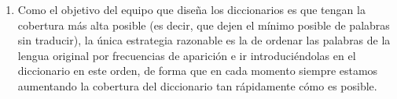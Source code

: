 \begin{enumerate}
\item Como el objetivo del equipo que diseña los diccionarios es que tengan la cobertura más alta posible (es decir, que dejen el mínimo posible de palabras sin traducir), la única estrategia razonable es la de ordenar las palabras de la lengua original por frecuencias de aparición e ir introduciéndolas en el diccionario en este orden, de forma que en cada momento siempre estamos aumentando la cobertura del diccionario tan rápidamente cómo es posible. 


\end{enumerate}
